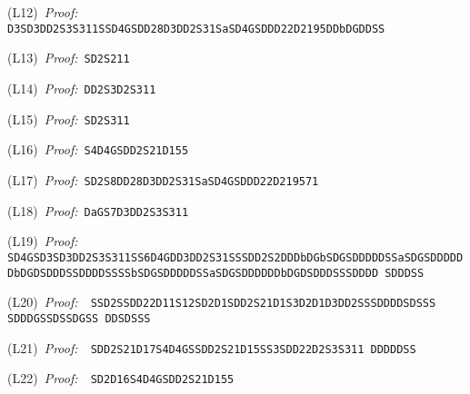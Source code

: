 \documentclass[leqno]{article}
\begin{document}
\begin{flushleft}
\noindent (L12)~{\em Proof:}~{\small\tt
D3SD3DD2S3S311SSD4GSDD28D3DD2S31SaSD4GSDDD22D2195\-D\-D\-b\-D\-G\-D\-D\-S\-S}

\noindent (L13)~{\em Proof:}~{\small\tt SD2S211}

\noindent (L14)~{\em Proof:}~{\small\tt DD2S3D2S311}

\noindent (L15)~{\em Proof:}~{\small\tt SD2S311}

\noindent (L16)~{\em Proof:}~{\small\tt S4D4GSDD2S21D155}

\noindent (L17)~{\em Proof:}~{\small\tt SD2S8DD28D3DD2S31SaSD4GSDDD22D219571}

\noindent (L18)~{\em Proof:}~{\small\tt DaGS7D3DD2S3S311}

\noindent (L19)~{\em Proof:}~{\small\tt
SD4GSD3SD3DD2S3S311SS6D4GDD3DD2S31SSSDD2S2\-D\-D\-D\-b\-D\-G\-b\-S\-D\-G\-S\-D\-D\-D\-D\-D\-S\-S\-a\-S\-D\-G\-S\-D\-D\-D\-D\-D\-D\-b\-D\-G\-D\-S\-D\-D\-D\-S\-S\-D\-D\-D\-D\-S\-S\-S\-S\-b\-S\-D\-G\-S\-D\-D\-D\-D\-D\-S\-S\-a\-S\-D\-G\-S\-D\-D\-D\-D\-D\-D\-b\-D\-G\-D\-S\-D\-D\-D\-S\-S\-S\-D\-D\-D\-D\-%
S\-D\-D\-D\-S\-S}

\noindent (L20)~{\em Proof:}~{\small\tt
SSD2SSDD22D11S12SD2D1SDD2S21D1S3D2D1D3DD2S\-S\-S\-D\-D\-D\-D\-S\-D\-S\-S\-S\-%
S\-D\-D\-D\-G\-S\-S\-D\-S\-S\-D\-G\-S\-S\-%
D\-D\-S\-D\-S\-S\-S}

\noindent (L21)~{\em Proof:}~{\small\tt
SDD2S21D17S4D4GSSDD2S21D15SS3SDD22D2S3S311\-%
D\-D\-D\-D\-D\-S\-S}

\noindent (L22)~{\em Proof:}~{\small\tt
SD2D16S4D4GSDD2S21D155}
\setlength{\parskip}{0ex}
\end{flushleft}

\newpage
\end{document}
